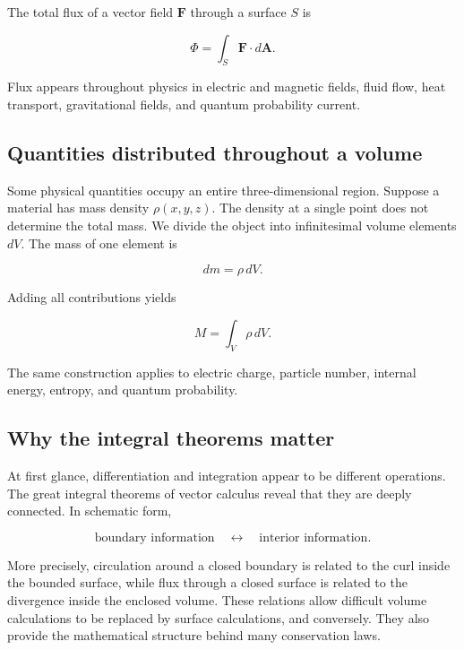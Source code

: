 The total flux of a vector field $\mathbf F$ through a surface $S$ is

\begin{equation}
  \boxed{\Phi=\int_S \mathbf F\cdot d\mathbf A.}
\end{equation}

Flux appears throughout physics in electric and magnetic fields, fluid flow,
heat transport, gravitational fields, and quantum probability current.

\subsection{Quantities distributed throughout a volume}

Some physical quantities occupy an entire three-dimensional region. Suppose a
material has mass density $\rho(x,y,z)$. The density at a single point does not
determine the total mass. We divide the object into infinitesimal volume
elements $dV$. The mass of one element is

\begin{equation}
  dm=\rho\,dV.
\end{equation}

Adding all contributions yields

\begin{equation}
  \boxed{M=\int_V \rho\,dV.}
\end{equation}

The same construction applies to electric charge, particle number, internal
energy, entropy, and quantum probability.

\subsection{Why the integral theorems matter}

At first glance, differentiation and integration appear to be different
operations. The great integral theorems of vector calculus reveal that they are
deeply connected. In schematic form,

\begin{equation}
  \boxed{\text{boundary information}\quad\longleftrightarrow\quad
  \text{interior information}.}
\end{equation}

More precisely, circulation around a closed boundary is related to the curl
inside the bounded surface, while flux through a closed surface is related to
the divergence inside the enclosed volume. These relations allow difficult
volume calculations to be replaced by surface calculations, and conversely.
They also provide the mathematical structure behind many conservation laws.

